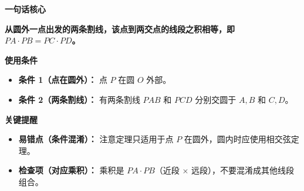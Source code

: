 \begin{summarybox}
	\textbf{\textcolor{CSummary}{一句话核心}}

	\textbf{从圆外一点出发的两条割线，该点到两交点的线段之积相等，即 $PA \cdot PB = PC \cdot PD$。}

	\medskip
	\textbf{\textcolor{CSummary}{使用条件}}
	\begin{itemize}[leftmargin=*, itemsep=0.5em, topsep=0.4em]
		\item \textbf{条件 1（点在圆外）：} 点 $P$ 在圆 $O$ 外部。
		\item \textbf{条件 2（两条割线）：} 有两条割线 $PAB$ 和 $PCD$ 分别交圆于 $A,B$ 和 $C,D$。
	\end{itemize}

	\medskip
	\textbf{\textcolor{CSummary}{关键提醒}}
	\begin{itemize}[leftmargin=*, itemsep=0.5em, topsep=0.4em]
		\item \textbf{易错点（条件混淆）：} 注意定理只适用于点 $P$ 在圆外，圆内时应使用相交弦定理。
		\item \textbf{检查项（对应乘积）：} 乘积是 $PA \cdot PB$（近段 $\times$ 远段），不要混淆成其他线段组合。
	\end{itemize}
\end{summarybox}
